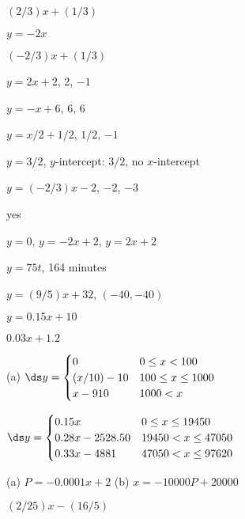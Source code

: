 \documentclass[symmetric,justified,marginals=raggedouter]{tufte-book}
\begin{document}
\begin{answer} $(2/3)x+(1/3)$
\end{answer}

\begin{answer} $y=-2x$
\end{answer}

\begin{answer} $(-2/3)x+(1/3)$
\end{answer}

\begin{answer} $y=2x+2$, 2, $-1$
\end{answer}

\begin{answer} $y=-x+6$, 6, 6
\end{answer}

\begin{answer} $y=x/2+1/2$, $1/2$, $-1$
\end{answer}

\begin{answer} $y=3/2$, $y$-intercept: $3/2$, no $x$-intercept
\end{answer}

\begin{answer} $y=(-2/3)x-2$, $-2$, $-3$
\end{answer}

\begin{answer} yes
\end{answer}

\begin{answer} $y=0$, $y=-2x+2$, $y=2x+2$
\end{answer}

\begin{answer} $y=75t$, 164 minutes
\end{answer}

\begin{answer} $y=(9/5)x+32$, $(-40,-40)$
\end{answer}

\begin{answer} $y=0.15x+10$
\end{answer}

\begin{answer} $0.03x+1.2$
\end{answer}

\begin{answer} (a) $\ds y=\begin{cases} 0 & 0\le x<100 \\
(x/10)-10& 100\le x\le 1000 \\
x-910 & 1000<x
\end{cases}$
\end{answer}

\begin{answer} $\ds y=\begin{cases} 0.15x & 0\le x\le 19450 \\
0.28x-2528.50&  19450<x\le 47050 \\
0.33x-4881 & 47050<x\le 97620 \\
\end{cases}$
\end{answer}

\begin{answer} (a) $P=-0.0001x+2$
(b) $x=-10000P+20000$
\end{answer}

\begin{answer} $(2/25)x-(16/5)$
\end{answer}
\end{document}
